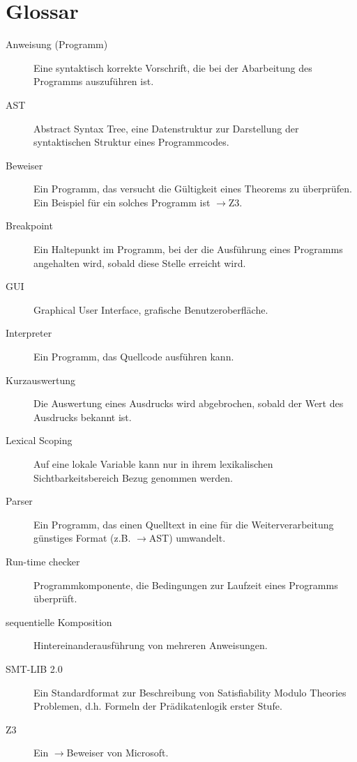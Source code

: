 \documentclass[a4paper,10pt]{article}
\begin{document}
\section{Glossar}
\begin{description}
\item[Anweisung (Programm)] Eine syntaktisch korrekte Vorschrift, die bei der Abarbeitung des Programms auszuf\"{u}hren ist.
\item[AST] Abstract Syntax Tree, eine Datenstruktur zur Darstellung der syntaktischen Struktur eines Programmcodes.
\item[Beweiser] Ein Programm, das versucht die G\"{u}ltigkeit eines Theorems zu \"{u}berpr\"{u}fen. Ein Beispiel f\"{u}r ein solches Programm ist $\to$Z3.
\item[Breakpoint] Ein Haltepunkt im Programm, bei der die Ausführung eines Programms angehalten wird, sobald diese Stelle erreicht wird.
\item[GUI] Graphical User Interface, grafische Benutzeroberfl\"{a}che.
\item[Interpreter] Ein Programm, das Quellcode ausf\"{u}hren kann.
\item[Kurzauswertung] Die Auswertung eines Ausdrucks wird abgebrochen, sobald der Wert des Ausdrucks bekannt ist.
\item[Lexical Scoping] Auf eine lokale Variable kann nur in ihrem lexikalischen Sichtbarkeitsbereich Bezug genommen werden.
\item[Parser] Ein Programm, das einen Quelltext in eine für die Weiterverarbeitung günstiges Format (z.B. $\to$AST) umwandelt.
\item[Run-time checker] Programmkomponente, die Bedingungen zur Laufzeit eines Programms \"{u}berpr\"{u}ft.
\item[sequentielle Komposition] Hintereinanderausf\"{u}hrung von mehreren Anweisungen.
\item[SMT-LIB 2.0] Ein Standardformat zur Beschreibung von Satisfiability Modulo Theories Problemen, d.h. Formeln der Pr\"{a}dikatenlogik erster Stufe.
\item[Z3] Ein $\to$Beweiser von Microsoft.
\end{description}
\end{document}

